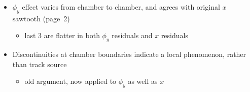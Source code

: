 \documentclass[compress]{beamer}
\begin{document}
\begin{frame}
\begin{columns}
\begin{itemize}
\item $\phi_y$ effect varies from chamber to chamber, and agrees with original $x$ sawtooth (page~2)
\begin{itemize}
\item last 3 are flatter in both $\phi_y$ residuals and $x$ residuals
\end{itemize}

\item Discontinuities at chamber boundaries indicate a local phenomenon, rather than track source
\begin{itemize}
\item old argument, now applied to $\phi_y$ as well as $x$
\end{itemize}

\end{itemize}
\end{columns}

\end{frame}
\end{document}
